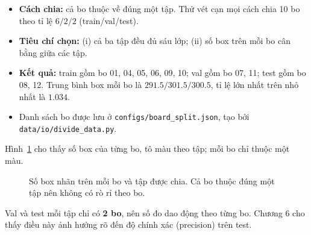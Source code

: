 \documentclass[11pt,a4paper]{article}
\newcommand{\hinhref}[1]{Hình~\ref{fig:#1}}
\begin{document}
\begin{itemize}
  \item \textbf{Cách chia:} cả bo thuộc về đúng một tập. Thử vét cạn mọi cách chia 10 bo theo tỉ lệ $6/2/2$ (train/val/test).
  \item \textbf{Tiêu chí chọn:} (i) cả ba tập đều đủ sáu lớp; (ii) số box trên mỗi bo cân bằng giữa các tập.
  \item \textbf{Kết quả:} train gồm bo 01, 04, 05, 06, 09, 10; val gồm bo 07, 11; test gồm bo 08, 12. Trung bình box mỗi bo là $291.5 / 301.5 / 300.5$, tỉ lệ lớn nhất trên nhỏ nhất là $1.034$.
  \item Danh sách bo được lưu ở \texttt{configs/board\_split.json}, tạo bởi \texttt{data/io/divide\_data.py}.
\end{itemize}

\hinhref{chiabo} cho thấy số box của từng bo, tô màu theo tập; mỗi bo chỉ thuộc một màu.

\begin{figure}[H]
\centering
{}
\caption{Số box nhãn trên mỗi bo và tập được chia. Cả bo thuộc đúng một tập nên không có rò rỉ theo bo.}
\label{fig:chiabo}
\end{figure}

\begin{luuy}
Val và test mỗi tập chỉ có \textbf{2 bo}, nên số đo dao động theo từng bo. Chương 6 cho thấy điều này ảnh hưởng rõ đến độ chính xác (precision) trên test.
\end{luuy}
\end{document}
